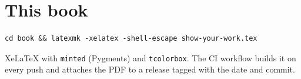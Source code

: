 \section*{This book}
\begin{verbatim}
cd book && latexmk -xelatex -shell-escape show-your-work.tex
\end{verbatim}
XeLaTeX with \texttt{minted} (Pygments) and \texttt{tcolorbox}. The CI workflow
 builds it on every push and attaches the PDF to a
release tagged with the date and commit.

